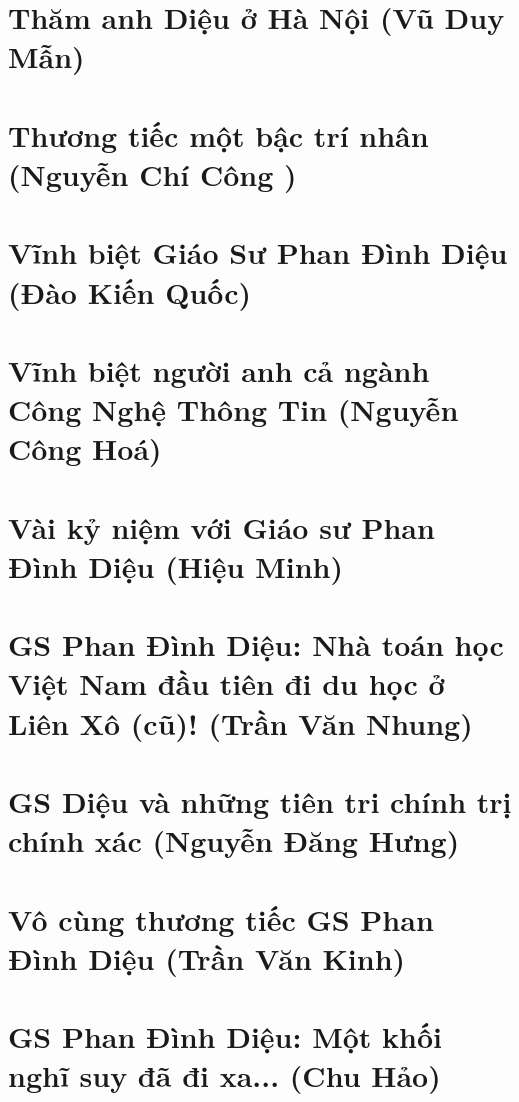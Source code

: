 \documentclass[11pt,twoside]{extreport}
\begin{document}
\chapter{Thăm anh Diệu ở Hà Nội (Vũ Duy Mẫn)}


\chapter{Thương tiếc một bậc trí nhân (Nguyễn Chí Công )}



\chapter{Vĩnh biệt Giáo Sư Phan Đình Diệu (Đào Kiến Quốc)}


\chapter{Vĩnh biệt người anh cả ngành Công Nghệ Thông Tin (Nguyễn Công Hoá)}



\chapter{Vài kỷ niệm với Giáo sư Phan Đình Diệu  (Hiệu Minh)}




\chapter{GS Phan Đình Diệu: Nhà toán học Việt Nam đầu tiên đi du học ở Liên Xô (cũ)! (Trần Văn Nhung)}


\chapter{GS Diệu và những tiên tri chính trị chính xác (Nguyễn Đăng Hưng)}


\chapter{Vô cùng thương tiếc GS Phan Đình Diệu (Trần Văn Kinh)}



\chapter{GS Phan Đình Diệu: Một khối nghĩ suy đã đi xa...  (Chu Hảo)}

\end{document}
